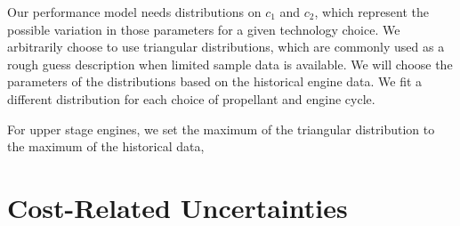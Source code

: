 \documentclass[conf]{../paper/new-aiaa}
\begin{document}
Our performance model needs distributions on $c_1$ and $c_2$, which represent the possible variation in those parameters for a given technology choice. We arbitrarily choose to use triangular distributions, which are commonly used as a rough guess description when limited sample data is available. We will choose the parameters of the distributions based on the historical engine data. We fit a different distribution for each choice of propellant and engine cycle.

For upper stage engines, we set the maximum of the triangular distribution to the maximum of the historical data, 


\section{Cost-Related Uncertainties}




\end{document}
